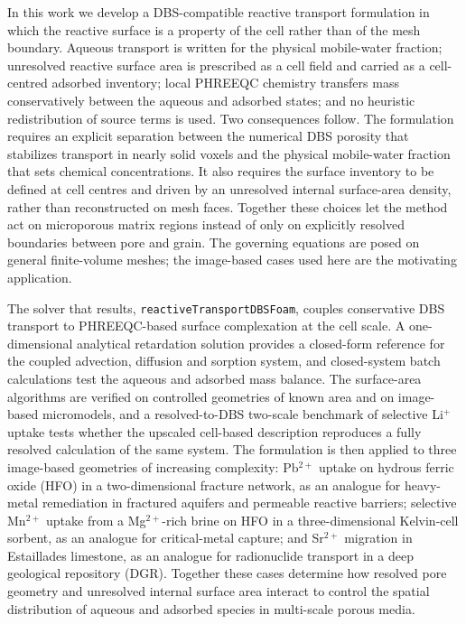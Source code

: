 In this work we develop a DBS-compatible reactive transport formulation in
which the reactive surface is a property of the cell rather than of the mesh
boundary. Aqueous transport is written for the physical mobile-water fraction;
unresolved reactive surface area is prescribed as a cell field and carried as a
cell-centred adsorbed inventory; local PHREEQC chemistry transfers mass
conservatively between the aqueous and adsorbed states; and no heuristic
redistribution of source terms is used. Two consequences follow. The
formulation requires an explicit separation between the numerical DBS porosity
that stabilizes transport in nearly solid voxels \citep{soulaine2016micro} and
the physical mobile-water fraction that sets chemical concentrations. It also
requires the surface inventory to be defined at cell centres and driven by an
unresolved internal surface-area density, rather than reconstructed on mesh
faces. Together these choices let the method act on microporous matrix regions
instead of only on explicitly resolved boundaries between pore and grain. The
governing equations are posed on general finite-volume meshes; the image-based
cases used here are the motivating application.

The solver that results, \texttt{reactiveTransportDBSFoam}, couples
conservative DBS transport to PHREEQC-based surface complexation at the cell
scale. A one-dimensional analytical retardation solution provides a closed-form
reference for the coupled advection, diffusion and sorption system, and
closed-system batch calculations test the aqueous and adsorbed mass balance.
The surface-area algorithms are verified on controlled geometries of known area
and on image-based micromodels, and a resolved-to-DBS two-scale benchmark of
selective Li$^{+}$ uptake tests whether the upscaled cell-based description
reproduces a fully resolved calculation of the same system. The formulation is
then applied to three image-based geometries of increasing complexity:
Pb$^{2+}$ uptake on hydrous ferric oxide (HFO) in a two-dimensional fracture
network, as an analogue for heavy-metal remediation in fractured aquifers and
permeable reactive barriers; selective Mn$^{2+}$ uptake from a Mg$^{2+}$-rich
brine on HFO in a three-dimensional Kelvin-cell sorbent, as an analogue for
critical-metal capture; and Sr$^{2+}$ migration in Estaillades limestone, as an
analogue for radionuclide transport in a deep geological repository (DGR).
Together these cases determine how resolved pore geometry and unresolved
internal surface area interact to control the spatial distribution of aqueous
and adsorbed species in multi-scale porous media.

